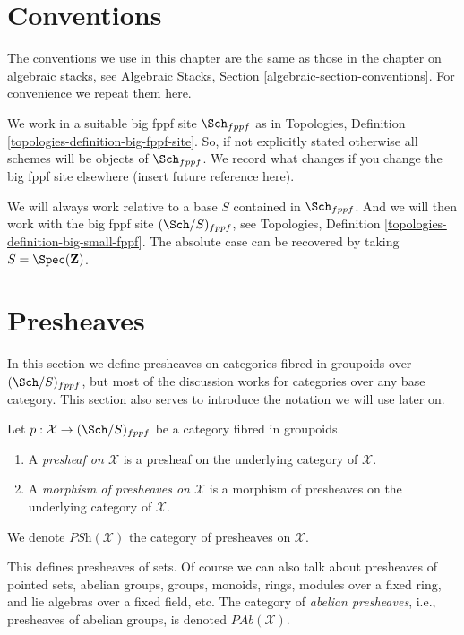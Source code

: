 \section{Conventions}
\label{section-conventions}

\noindent
The conventions we use in this chapter are the same as those in the
chapter on algebraic stacks, see
Algebraic Stacks, Section \ref{algebraic-section-conventions}.
For convenience we repeat them here.

\medskip\noindent
We work in a suitable big fppf site $\Sch_{fppf}$ as in
Topologies, Definition \ref{topologies-definition-big-fppf-site}.
So, if not explicitly stated otherwise all schemes will be objects
of $\Sch_{fppf}$. We record what changes if you change the big
fppf site elsewhere (insert future reference here).

\medskip\noindent
We will always work relative to a base $S$ contained in $\Sch_{fppf}$.
And we will then work with the big fppf site $(\Sch/S)_{fppf}$, see
Topologies, Definition \ref{topologies-definition-big-small-fppf}.
The absolute case can be recovered by taking
$S = \Spec(\mathbf{Z})$.





\section{Presheaves}
\label{section-presheaves}

\noindent
In this section we define presheaves on categories fibred in groupoids
over $(\Sch/S)_{fppf}$, but most of the discussion works
for categories over any base category. This section also serves to
introduce the notation we will use later on.

\begin{definition}
\label{definition-presheaves}
Let $p : \mathcal{X} \to (\Sch/S)_{fppf}$ be a category fibred in
groupoids.
\begin{enumerate}
\item A {\it presheaf on $\mathcal{X}$} is a presheaf on the
underlying category of $\mathcal{X}$.
\item A {\it morphism of presheaves on $\mathcal{X}$} is a morphism of
presheaves on the underlying category of $\mathcal{X}$.
\end{enumerate}
We denote $\textit{PSh}(\mathcal{X})$ the category of presheaves on
$\mathcal{X}$.
\end{definition}

\noindent
This defines presheaves of sets. Of course we can also talk about
presheaves of pointed sets, abelian groups, groups, monoids, rings,
modules over a fixed ring, and lie algebras over a fixed field, etc.
The category of {\it abelian presheaves}, i.e., presheaves of abelian
groups, is denoted $\textit{PAb}(\mathcal{X})$.

